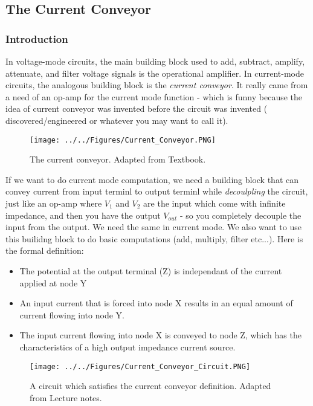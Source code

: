 \subsection{The Current Conveyor}

\subsubsection{Introduction}

In voltage-mode circuits, the main building block used to add, subtract, amplify, attenuate, and filter voltage signals is the operational amplifier. In current-mode circuits, the analogous building block is the \textit{current conveyor}. It really came from a need of an op-amp for the current mode function - which is funny because the idea of current conveyor was invented before the circuit was invented ( discovered/engineered or whatever you may want to call it). 

\begin{figure}[H]
    \centering
    \texttt{[image: ../../Figures/Current\_Conveyor.PNG]}
    \caption{The current conveyor. Adapted from Textbook.}
    \label{fig:Current_Conveyor}
\end{figure}

If we want to do current mode computation, we need a building block that can convey current from input terminl to output terminl while \textit{decoulpling} the circuit, just like an op-amp where $V_1$ and $V_2$ are the input which come with infinite impedance, and then you have the output $V_{out}$ - so you completely decouple the input from the output. We need the same in current mode. We also want to use this builidng block to do basic computations (add, multiply, filter etc...). Here is the formal definition: 

\begin{itemize}
    \item The potential at the output terminal (Z) is independant of the current applied at node Y
    \item An input current that is forced into node X results in an equal amount of current flowing into node Y.
    \item The input current flowing into node X is conveyed to node Z, which has the characteristics of a high output impedance current source.
\end{itemize}

\begin{figure}[H]
    \centering
    \texttt{[image: ../../Figures/Current\_Conveyor\_Circuit.PNG]}
    \caption{A circuit which satisfies the current conveyor definition. Adapted from Lecture notes.}
    \label{fig:Current_Conveyor_Circuit}
\end{figure}

